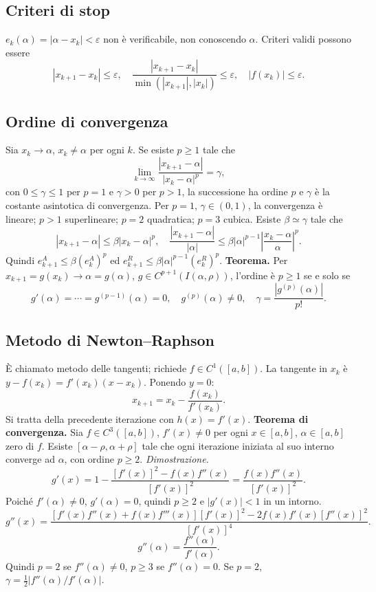 \documentclass[11pt,a4paper]{article}
\newcommand{\pagina}[1]{\clearpage}
\begin{document}
\subsection*{Criteri di stop}
$e_k(\alpha)=|\alpha-x_k|<\varepsilon$ non è verificabile, non conoscendo $\alpha$. Criteri validi possono essere
\[|x_{k+1}-x_k|\le\varepsilon,\quad\frac{|x_{k+1}-x_k|}{\min(|x_{k+1}|,|x_k|)}\le\varepsilon,\quad |f(x_k)|\le\varepsilon.\]
\subsection*{Ordine di convergenza}
Sia $x_k\to\alpha$, $x_k\ne\alpha$ per ogni $k$. Se esiste $p\ge1$ tale che
\[\lim_{k\to\infty}\frac{|x_{k+1}-\alpha|}{|x_k-\alpha|^p}=\gamma,\]
con $0\le\gamma\le1$ per $p=1$ e $\gamma>0$ per $p>1$, la successione ha ordine $p$ e $\gamma$ è la costante asintotica di convergenza. Per $p=1$, $\gamma\in(0,1)$, la convergenza è lineare; $p>1$ superlineare; $p=2$ quadratica; $p=3$ cubica.
Esiste $\beta\simeq\gamma$ tale che
\[|x_{k+1}-\alpha|\le\beta|x_k-\alpha|^p,\quad\frac{|x_{k+1}-\alpha|}{|\alpha|}\le\beta|\alpha|^{p-1}\left|\frac{x_k-\alpha}{\alpha}\right|^p.\]
Quindi $e^A_{k+1}\le\beta(e^A_k)^p$ ed $e^R_{k+1}\le\beta|\alpha|^{p-1}(e^R_k)^p$.
\pagina{14}
\textbf{Teorema.} Per $x_{k+1}=g(x_k)\to\alpha=g(\alpha)$, $g\in C^{p+1}(I(\alpha,\rho))$, l'ordine è $p\ge1$ se e solo se
\[g'(\alpha)=\cdots=g^{(p-1)}(\alpha)=0,\quad g^{(p)}(\alpha)\ne0,\quad\gamma=\frac{|g^{(p)}(\alpha)|}{p!}.\]
\subsection*{Metodo di Newton--Raphson}
È chiamato metodo delle tangenti; richiede $f\in C^1([a,b])$. La tangente in $x_k$ è $y-f(x_k)=f'(x_k)(x-x_k)$. Ponendo $y=0$:
\[x_{k+1}=x_k-\frac{f(x_k)}{f'(x_k)}.\]
Si tratta della precedente iterazione con $h(x)=f'(x)$.
\textbf{Teorema di convergenza.} Sia $f\in C^3([a,b])$, $f'(x)\ne0$ per ogni $x\in[a,b]$, $\alpha\in[a,b]$ zero di $f$. Esiste $[\alpha-\rho,\alpha+\rho]$ tale che ogni iterazione iniziata al suo interno converge ad $\alpha$, con ordine $p\ge2$.
\pagina{15}
\textit{Dimostrazione.}
\[g'(x)=1-\frac{[f'(x)]^2-f(x)f''(x)}{[f'(x)]^2}=\frac{f(x)f''(x)}{[f'(x)]^2}.\]
Poiché $f'(\alpha)\ne0$, $g'(\alpha)=0$, quindi $p\ge2$ e $|g'(x)|<1$ in un intorno.
\[g''(x)=\frac{[f'(x)f''(x)+f(x)f'''(x)][f'(x)]^2-2f(x)f'(x)[f''(x)]^2}{[f'(x)]^4}.\]
\[g''(\alpha)=\frac{f''(\alpha)}{f'(\alpha)}.\]
Quindi $p=2$ se $f''(\alpha)\ne0$, $p\ge3$ se $f''(\alpha)=0$. Se $p=2$, $\gamma=\frac12|f''(\alpha)/f'(\alpha)|$.
\end{document}
